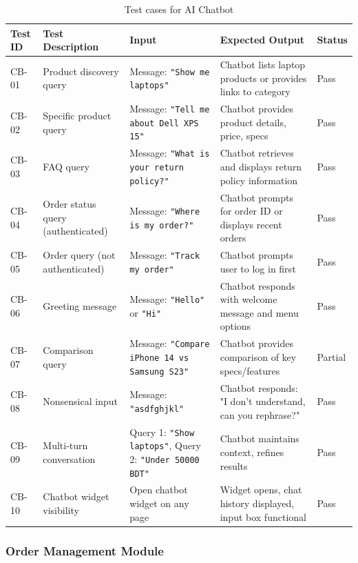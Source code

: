 \begin{table}[H]
\centering
\caption{Test cases for AI Chatbot}
\label{tab:test-chatbot}
\small
\begin{tabular}{|p{1.3cm}|p{3.5cm}|p{3cm}|p{3.5cm}|p{1.2cm}|}
\hline
\textbf{Test ID} & \textbf{Test Description} & \textbf{Input} & \textbf{Expected Output} & \textbf{Status} \\
\hline
CB-01 & Product discovery query & Message: \texttt{"Show me laptops"} & Chatbot lists laptop products or provides links to category & Pass \\
\hline
CB-02 & Specific product query & Message: \texttt{"Tell me about Dell XPS 15"} & Chatbot provides product details, price, specs & Pass \\
\hline
CB-03 & FAQ query & Message: \texttt{"What is your return policy?"} & Chatbot retrieves and displays return policy information & Pass \\
\hline
CB-04 & Order status query (authenticated) & Message: \texttt{"Where is my order?"} & Chatbot prompts for order ID or displays recent orders & Pass \\
\hline
CB-05 & Order query (not authenticated) & Message: \texttt{"Track my order"} & Chatbot prompts user to log in first & Pass \\
\hline
CB-06 & Greeting message & Message: \texttt{"Hello"} or \texttt{"Hi"} & Chatbot responds with welcome message and menu options & Pass \\
\hline
CB-07 & Comparison query & Message: \texttt{"Compare iPhone 14 vs Samsung S23"} & Chatbot provides comparison of key specs/features & Partial \\
\hline
CB-08 & Nonsensical input & Message: \texttt{"asdfghjkl"} & Chatbot responds: "I don't understand, can you rephrase?" & Pass \\
\hline
CB-09 & Multi-turn conversation & Query 1: \texttt{"Show laptops"}, Query 2: \texttt{"Under 50000 BDT"} & Chatbot maintains context, refines results & Pass \\
\hline
CB-10 & Chatbot widget visibility & Open chatbot widget on any page & Widget opens, chat history displayed, input box functional & Pass \\
\hline
\end{tabular}
\end{table}

\subsubsection*{Order Management Module}

